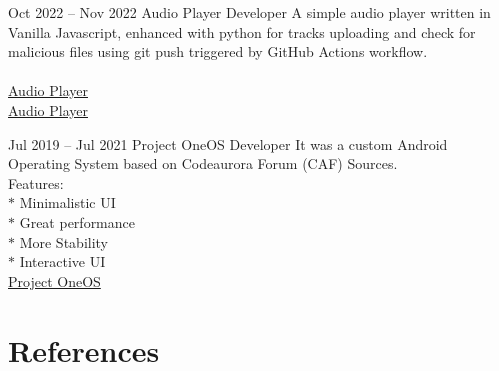 \documentclass[
	10pt, %
]{FreemanCV}
\begin{document}
\begin{paracol}{2}

\jobentry
	{Oct 2022 -- Nov 2022} %
	{} %
	{Audio Player} %
	{Developer} %
	{A simple audio player written in Vanilla Javascript, enhanced with python for tracks uploading and check for malicious files using git push triggered by GitHub Actions workflow.\\
	\\
	\raisebox{-1pt}{\faGithubSquare} \href{https://github.com/AndroiableDroid/audioplayer}{Audio Player}\\
	\raisebox{-1pt}{\faGlobe} \href{https://github.com/AndroiableDroid/audioplayer}{Audio Player}} %


\jobentry
	{Jul 2019 -- Jul 2021} %
	{} %
	{Project OneOS} %
	{Developer} %
	{It was a custom Android Operating System based on Codeaurora Forum (CAF) Sources.\\
	Features:\\
	 $*$ Minimalistic UI\\
	 $*$ Great performance\\
	 $*$ More Stability\\
	 $*$ Interactive UI\\
	\raisebox{-1pt}{\faGithubSquare} \href{https://github.com/Project-OneOS}{Project OneOS}} %


\section{References}






\end{paracol}
\end{document}
